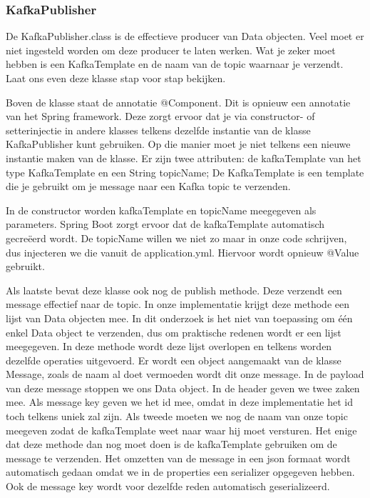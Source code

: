     \subsubsection{KafkaPublisher}
    De KafkaPublisher.class is de effectieve producer van Data objecten. Veel moet er niet ingesteld worden om deze producer te laten werken. Wat je zeker moet hebben is een KafkaTemplate en de naam van de topic waarnaar je verzendt. Laat ons even deze klasse stap voor stap bekijken.
    
    Boven de klasse staat de annotatie @Component. Dit is opnieuw een annotatie van het Spring framework. Deze zorgt ervoor dat je via constructor- of setterinjectie in andere klasses telkens dezelfde instantie van de klasse KafkaPublisher kunt gebruiken. Op die manier moet je niet telkens een nieuwe instantie maken van de klasse. Er zijn twee attributen: de kafkaTemplate van het type KafkaTemplate en een String topicName; De KafkaTemplate is een template die je gebruikt om je message naar een Kafka topic te verzenden.
    
    In de constructor worden kafkaTemplate en topicName meegegeven als parameters. Spring Boot zorgt ervoor dat de kafkaTemplate automatisch gecreëerd wordt. De topicName willen we niet zo maar in onze code schrijven, dus injecteren we die vanuit de application.yml. Hiervoor wordt opnieuw @Value gebruikt.
    
    Als laatste bevat deze klasse ook nog de publish methode. Deze verzendt een message effectief naar de topic. In onze implementatie krijgt deze methode een lijst van Data objecten mee. In dit onderzoek is het niet van toepassing om één enkel Data object te verzenden, dus om praktische redenen wordt er een lijst meegegeven. In deze methode wordt deze lijst overlopen en telkens worden dezelfde operaties uitgevoerd. Er wordt een object aangemaakt van de klasse Message, zoals de naam al doet vermoeden wordt dit onze message. In de payload van deze message stoppen we ons Data object. In de header geven we twee zaken mee. Als message key geven we het id mee, omdat in deze implementatie het id toch telkens uniek zal zijn. Als tweede moeten we nog de naam van onze topic meegeven zodat de kafkaTemplate weet naar waar hij moet versturen. Het enige dat deze methode dan nog moet doen is de kafkaTemplate gebruiken om de message te verzenden. Het omzetten van de message in een json formaat wordt automatisch gedaan omdat we in de properties een serializer opgegeven hebben. Ook de message key wordt voor dezelfde reden automatisch geserializeerd. 
 
